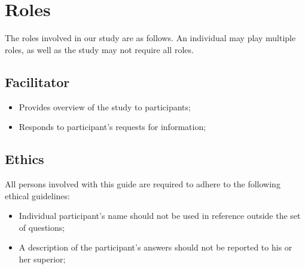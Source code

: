 
\section{Roles}
\label{sec:sec004}

The roles involved in our study are as follows.
An individual may play multiple roles, as well as the study may not require all roles.

\subsection{Facilitator}

\begin{itemize}
\item Provides overview of the study to participants;
\item Responds to participant's requests for information;
\end{itemize}

\subsection{Ethics}

All persons involved with this guide are required to adhere to the following ethical guidelines:

\begin{itemize}
\item Individual participant's name should not be used in reference outside the set of questions;
\item A description of the participant's answers should not be reported to his or her superior;
\end{itemize}

